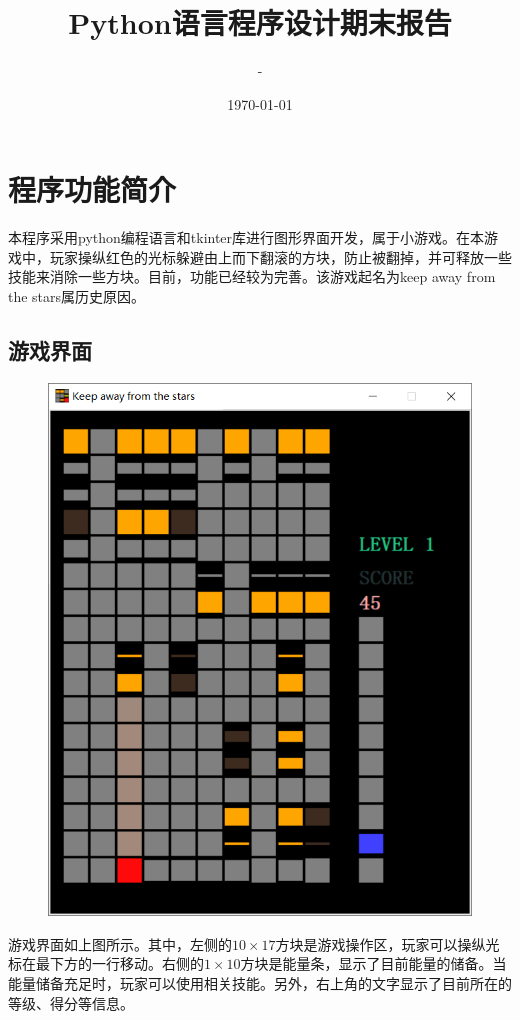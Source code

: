 \documentclass[UTF8]{article}
\title{Python语言程序设计期末报告}
\author{-}
\date\today
\begin{document}
\maketitle
\tableofcontents

\section{程序功能简介}

本程序采用python编程语言和tkinter库进行图形界面开发，属于小游戏。在本游戏中，玩家操纵红色的光标躲避由上而下翻滚的方块，防止被翻掉，并可释放一些技能来消除一些方块。目前，功能已经较为完善。该游戏起名为keep away from the stars属历史原因。

\subsection{游戏界面}
\begin{center}
\begin{figure}[H]
\centering
\includegraphics[scale=0.52]{fig_1.png}
\end{figure}
\end{center}
游戏界面如上图所示。其中，左侧的$10\times 17$方块是游戏操作区，玩家可以操纵光标在最下方的一行移动。右侧的$1\times 10$方块是能量条，显示了目前能量的储备。当能量储备充足时，玩家可以使用相关技能。另外，右上角的文字显示了目前所在的等级、得分等信息。
\end{document}

